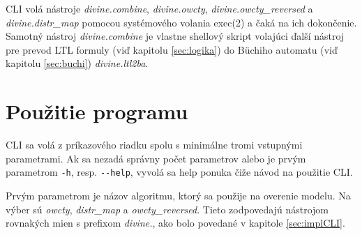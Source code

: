 \documentclass[11pt,final,oneside]{fithesis}
\begin{document}
CLI vol\'a n\'astroje {\it divine.combine}, {\it divine.owcty}, {\it divine.owcty\_reversed} a {\it divine.distr\_map} pomocou syst\'emov\'eho volania 
exec(2) a \v cak\'a na ich dokon\v cenie. Samotn\'y n\'astroj {\it divine.combine} je vlastne shellov\'y skript volaj\'uci \v dal\-\v s\'i n\'astroj pre 
prevod LTL formuly (vi\v d kapitolu \ref{sec:logika}) do B\"uchiho automatu (vi\v d kapitolu \ref{sec:buchi}) {\it divine.ltl2ba}.


\chapter{Pou\v zitie programu}
\label{sec:using}
CLI sa vol\'a z pr\'ikazov\'eho riadku spolu s minim\'alne tromi vstupn\'ymi parametrami. Ak sa nezad\'a spr\'avny po\v cet parametrov alebo je 
prv\'ym parametrom {\tt -h}, resp. {\tt {-}{-}help}, vyvol\'a sa help ponuka \v ci\v ze n\'avod na pou\v zitie CLI.

Prv\'ym parametrom je n\'azov algoritmu, ktor\'y sa pou\v zije na overenie modelu. Na v\'yber s\'u {\it owcty}, {\it distr\_map} a {\it owcty\_reversed}. 
Tieto zodpovedaj\'u n\'astrojom rovnak\'ych mien s prefixom {\it divine.}, ako bolo povedan\'e v kapitole \ref{sec:implCLI}.
\end{document}
